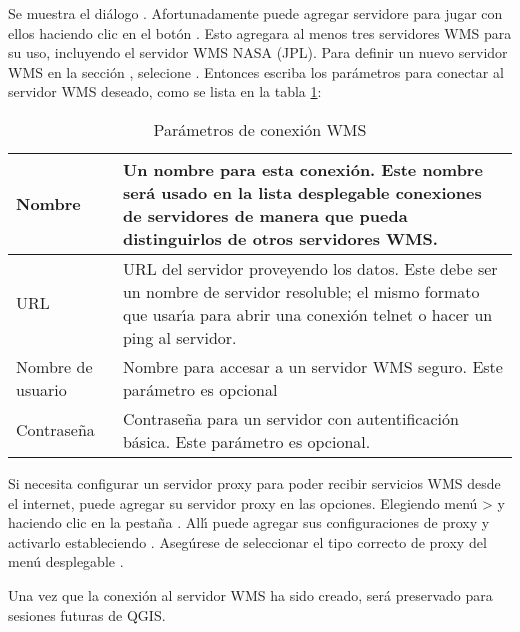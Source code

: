 Se muestra el di\'alogo . Afortunadamente puede 
agregar servidore para jugar con ellos haciendo clic en el bot\'on . 
Esto agregara al menos tres servidores WMS para su uso, incluyendo el servidor WMS NASA (JPL). 
Para definir un nuevo servidor WMS en la secci\'on , 
selecione . Entonces escriba los par\'ametros para conectar al servidor
WMS deseado, como se lista en la tabla \ref{tab:wms_connection_parms}:

\begin{table}[ht]
\centering
\caption{Par\'ametros de conexi\'on WMS}\label{tab:wms_connection_parms}\medskip
 \begin{tabular}{|l|p{5in}|}
\hline Nombre & Un nombre para esta conexi\'on.  Este nombre ser\'a usado en la
 lista desplegable conexiones de servidores de manera que pueda distinguirlos de
 otros servidores WMS. \\
\hline URL \index{WMS!URL} & URL del servidor proveyendo los datos.
 Este debe ser un nombre de servidor resoluble; el mismo formato que usar\'{\i}a 
 para abrir una conexi\'on telnet o hacer un ping al servidor. \\
\hline Nombre de usuario \index{WMS!authentification} & Nombre para accesar a
un servidor WMS seguro. Este par\'ametro es opcional \\
\hline Contrase\~na & Contrase\~na para un servidor con autentificaci\'on b\'asica. Este par\'ametro
es opcional.\\
\hline
\end{tabular}
\end{table}

Si necesita configurar un servidor proxy para poder recibir servicios WMS
desde el internet, puede agregar su servidor proxy en las opciones.
Elegiendo men\'u  > 
y haciendo clic en la pesta\~na . All\'{\i} puede agregar sus configuraciones de proxy 
y activarlo estableciendo .
Aseg\'urese de seleccionar el tipo correcto de proxy del men\'u desplegable
.

Una vez que la conexi\'on al servidor WMS ha sido creado, ser\'a preservado
para sesiones futuras de QGIS.

\begin{Tip}[ht]\caption{\textsc{En URLs de servidores WMS}}
\end{Tip}

